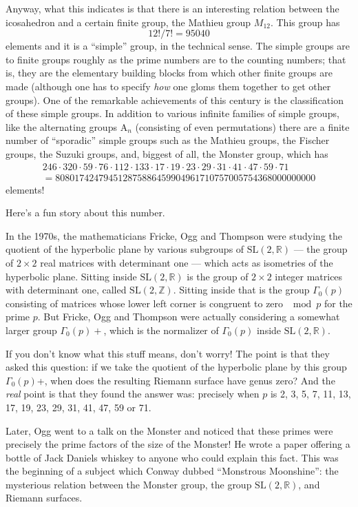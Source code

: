 \documentclass{article}
\begin{document}
Anyway, what this indicates is that there is an interesting relation
between the icosahedron and a certain finite group, the Mathieu group
\(M_{12}\). This group has \[12!/7! = 95040\] elements and it is a
``simple'' group, in the technical sense. The simple groups are to
finite groups roughly as the prime numbers are to the counting numbers;
that is, they are the elementary building blocks from which other finite
groups are made (although one has to specify \emph{how} one gloms them
together to get other groups). One of the remarkable achievements of
this century is the classification of these simple groups. In addition
to various infinite families of simple groups, like the alternating
groups \(\mathrm{A}_n\) (consisting of even permutations) there are a
finite number of ``sporadic'' simple groups such as the Mathieu groups,
the Fischer groups, the Suzuki groups, and, biggest of all, the Monster
group, which has
\[\begin{gathered}246\cdot320\cdot59\cdot76\cdot112\cdot133\cdot17\cdot19\cdot23\cdot29\cdot31\cdot41\cdot47\cdot59\cdot71 \\= 808017424794512875886459904961710757005754368000000000\end{gathered}\]
elements!

Here's a fun story about this number.

In the 1970s, the mathematicians Fricke, Ogg and Thompson were studying
the quotient of the hyperbolic plane by various subgroups of
\(\mathrm{SL}(2,\mathbb{R})\) --- the group of \(2\times2\) real
matrices with determinant one --- which acts as isometries of the
hyperbolic plane. Sitting inside \(\mathrm{SL}(2,\mathbb{R})\) is the
group of \(2\times2\) integer matrices with determinant one, called
\(\mathrm{SL}(2,\mathbb{Z})\). Sitting inside that is the group
\(\Gamma_0(p)\) consisting of matrices whose lower left corner is
congruent to zero \(\mod p\) for the prime \(p\). But Fricke, Ogg and
Thompson were actually considering a somewhat larger group
\(\Gamma_0(p)+\), which is the normalizer of \(\Gamma_0(p)\) inside
\(\mathrm{SL}(2,\mathbb{R})\).

If you don't know what this stuff means, don't worry! The point is that
they asked this question: if we take the quotient of the hyperbolic
plane by this group \(\Gamma_0(p)\)+, when does the resulting Riemann
surface have genus zero? And the \emph{real} point is that they found
the answer was: precisely when \(p\) is 2, 3, 5, 7, 11, 13, 17, 19, 23,
29, 31, 41, 47, 59 or 71.

Later, Ogg went to a talk on the Monster and noticed that these primes
were precisely the prime factors of the size of the Monster! He wrote a
paper offering a bottle of Jack Daniels whiskey to anyone who could
explain this fact. This was the beginning of a subject which Conway
dubbed ``Monstrous Moonshine'': the mysterious relation between the
Monster group, the group \(\mathrm{SL}(2,\mathbb{R})\), and Riemann
surfaces.
\end{document}
